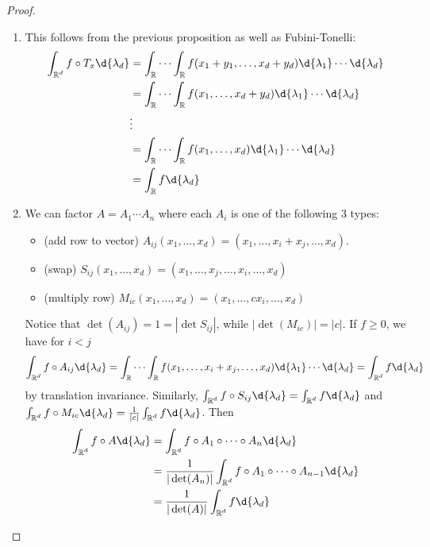 \documentclass[11pt, a4paper]{memoir}
\DeclareMathOperator{\R}{{\mathbb{R}}}
\theoremstyle{change}
\theoremstyle{plain}
\theoremstyle{nonumberplain}
\newtheorem{proof}{Proof}
\begin{document}
\begin{proof}
    \begin{enumerate}[label=(\roman*)]
        \item This follows from the previous proposition as well as Fubini-Tonelli:
            \begin{align*}
                \int_{\R^d}f\circ T_x\d{\lambda_d} &= \int_{\R}\cdots\int_{\R}f(x_1+y_1,\ldots,x_d+y_d)\d{\lambda_1}\cdots\d{\lambda_d}\\
                                                   &= \int_{\R}\cdots\int_{\R}f(x_1,\ldots,x_d+y_d)\d{\lambda_1}\cdots\d{\lambda_d}\\
                                                   &\vdots\\
                                                   &= \int_{\R}\cdots\int_{\R}f(x_1,\ldots,x_d)\d{\lambda_1}\cdots\d{\lambda_d}\\
                                                   &= \int_{\R}f\d{\lambda_d}
            \end{align*}
        \item We can factor $A=A_1\cdots A_n$ where each $A_i$ is one of the following 3 types:
            \begin{itemize}[nolistsep]
                \item (add row to vector) $A_{ij}(x_1,\ldots,x_d)=(x_1,\ldots,x_i+x_j,\ldots,x_d)$.
                \item (swap) $S_{ij}(x_1,\ldots,x_d)=(x_1,\ldots,x_j,\ldots,x_i,\ldots,x_d)$
                \item (multiply row) $M_{ic}(x_1,\ldots,x_d)=(x_1,\ldots,cx_i,\ldots,x_d)$
            \end{itemize}
            Notice that $\det(A_{ij})=1=|\det S_{ij}|$, while $|\det(M_{ic})|=|c|$.
            If $f\geq 0$, we have for $i<j$
            \begin{equation*}
                \int_{\R^d}f\circ A_{ij}\d{\lambda_d}=\int_{\R}\cdots\int_{\R} f(x_1,\ldots,x_i+x_j,\ldots,x_d)\d{\lambda_1}\cdots\d{\lambda_d}=\int_{\R^d}f\d{\lambda_d}
            \end{equation*}
            by translation invariance.
            Similarly, $\int_{\R^d}f\circ S_{ij}\d{\lambda_d}=\int_{\R^d}f\d{\lambda_d}$ and $\int_{\R^d}f\circ M_{ic}\d{\lambda_d}=\frac{1}{|c|}\int_{\R^d}f\d{\lambda_d}$.
            Then
            \begin{align*}
                \int_{\R^d}f\circ A\d{\lambda_d} &= \int_{\R^d}f\circ A_1\circ\cdots\circ A_n\d{\lambda_d}\\
                                                 &=\frac{1}{|\det(A_n)|}\int_{\R^d}f\circ A_1\circ\cdots\circ A_{n-1}\d{\lambda_d}\\
                                                 &= \frac{1}{|\det(A)|}\int_{\R^d}f\d{\lambda_d}
            \end{align*}
    \end{enumerate}
\end{proof}
\end{document}

